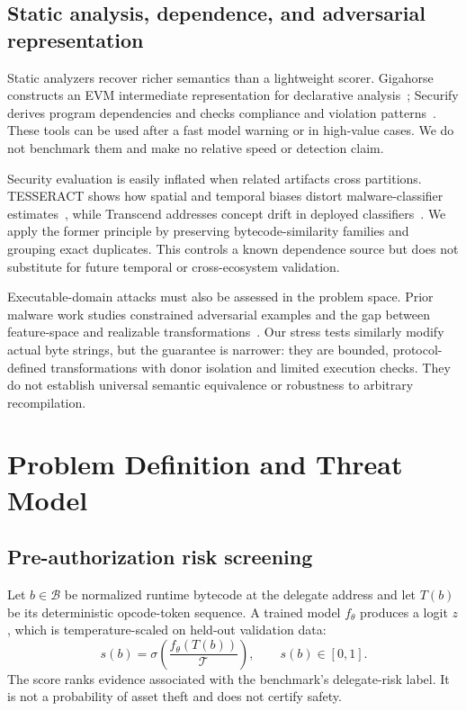 \documentclass[conference]{IEEEtran}
\begin{document}
\subsection{Static analysis, dependence, and adversarial representation}

Static analyzers recover richer semantics than a lightweight scorer. Gigahorse constructs an EVM
intermediate representation for declarative analysis~\cite{grech2019gigahorse}; Securify derives
program dependencies and checks compliance and violation patterns~\cite{tsankov2018securify}.
These tools can be used after a fast model warning or in high-value cases. We do not benchmark
them and make no relative speed or detection claim.

Security evaluation is easily inflated when related artifacts cross partitions. TESSERACT shows
how spatial and temporal biases distort malware-classifier estimates~\cite{pendlebury2019tesseract},
while Transcend addresses concept drift in deployed classifiers~\cite{jordaney2017transcend}.
We apply the former principle by preserving bytecode-similarity families and grouping exact
duplicates. This controls a known dependence source but does not substitute for future temporal
or cross-ecosystem validation.

Executable-domain attacks must also be assessed in the problem space. Prior malware work studies
constrained adversarial examples and the gap between feature-space and realizable
transformations~\cite{grosse2017adversarial,pierazzi2020problemspace}. Our stress tests similarly
modify actual byte strings, but the guarantee is narrower: they are bounded, protocol-defined
transformations with donor isolation and limited execution checks. They do not establish
universal semantic equivalence or robustness to arbitrary recompilation.

\section{Problem Definition and Threat Model}
\label{sec:problem}

\subsection{Pre-authorization risk screening}

Let $b\in\mathcal{B}$ be normalized runtime bytecode at the delegate address and let $T(b)$ be its
deterministic opcode-token sequence. A trained model $f_\theta$ produces a logit $z$, which is
temperature-scaled on held-out validation data:
\begin{equation}
  s(b)=\sigma\!\left(\frac{f_\theta(T(b))}{\mathcal{T}}\right), \qquad s(b)\in[0,1].
  \label{eq:score}
\end{equation}
The score ranks evidence associated with the benchmark's delegate-risk label. It is not a
probability of asset theft and does not certify safety.
\end{document}

